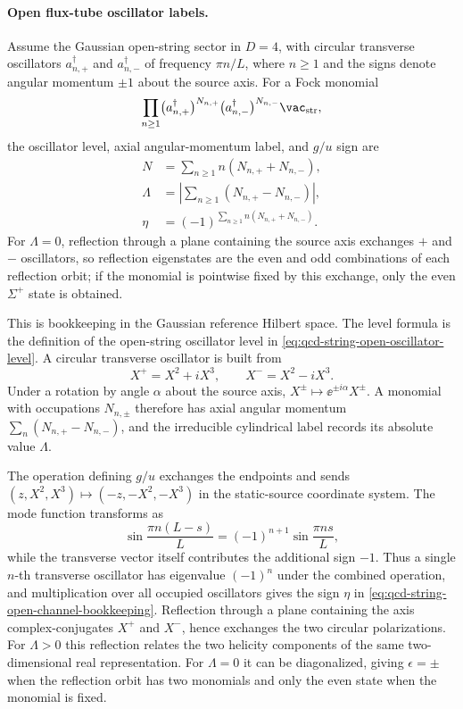 \paragraph{Open flux-tube oscillator labels.}
Assume the Gaussian open-string sector in \(D=4\), with circular transverse
oscillators \(a_{n,+}^{\dagger}\) and \(a_{n,-}^{\dagger}\) of frequency
\(\pi n/L\), where \(n\geq1\) and the signs denote angular momentum
\(\pm1\) about the source axis.  For a Fock monomial
\[
  \prod_{n\geq1}
  \bigl(a_{n,+}^{\dagger}\bigr)^{N_{n,+}}
  \bigl(a_{n,-}^{\dagger}\bigr)^{N_{n,-}}\vac_{\rm str},
\]
the oscillator level, axial angular-momentum label, and \(g/u\) sign are
\begin{align}
  N&=\sum_{n\geq1}n(N_{n,+}+N_{n,-}),\\
  \Lambda&=\left|\sum_{n\geq1}(N_{n,+}-N_{n,-})\right|,\\
  \eta&=(-1)^{\sum_{n\geq1}n(N_{n,+}+N_{n,-})}.
  \label{eq:qcd-string-open-channel-bookkeeping}
\end{align}
For \(\Lambda=0\), reflection through a plane containing the source axis
exchanges \(+\) and \(-\) oscillators, so reflection eigenstates are the even
and odd combinations of each reflection orbit; if the monomial is pointwise
fixed by this exchange, only the even \(\Sigma^+\) state is obtained.

This is bookkeeping in the Gaussian reference Hilbert space.
The level formula is the definition of the open-string oscillator level in
\eqref{eq:qcd-string-open-oscillator-level}.  A circular transverse
oscillator is built from
\[
  X^{+}=X^2+iX^3,\qquad X^{-}=X^2-iX^3 .
\]
Under a rotation by angle \(\alpha\) about the source axis,
\(X^{\pm}\mapsto \ee^{\pm i\alpha}X^{\pm}\).  A monomial with occupations
\(N_{n,\pm}\) therefore has axial angular momentum
\(\sum_n(N_{n,+}-N_{n,-})\), and the irreducible cylindrical label records
its absolute value \(\Lambda\).

The operation defining \(g/u\) exchanges the endpoints and sends
\((z,X^2,X^3)\mapsto(-z,-X^2,-X^3)\) in the static-source coordinate system.
The mode function transforms as
\[
  \sin\frac{\pi n(L-s)}{L}
  =
  (-1)^{n+1}\sin\frac{\pi ns}{L},
\]
while the transverse vector itself contributes the additional sign \(-1\).
Thus a single \(n\)-th transverse oscillator has eigenvalue \((-1)^n\) under
the combined operation, and multiplication over all occupied oscillators gives
the sign \(\eta\) in
\eqref{eq:qcd-string-open-channel-bookkeeping}.  Reflection through a plane
containing the axis complex-conjugates \(X^+\) and \(X^-\), hence exchanges
the two circular polarizations.  For \(\Lambda>0\) this reflection relates the
two helicity components of the same two-dimensional real representation.  For
\(\Lambda=0\) it can be diagonalized, giving \(\epsilon=\pm\) when the
reflection orbit has two monomials and only the even state when the monomial
is fixed.

